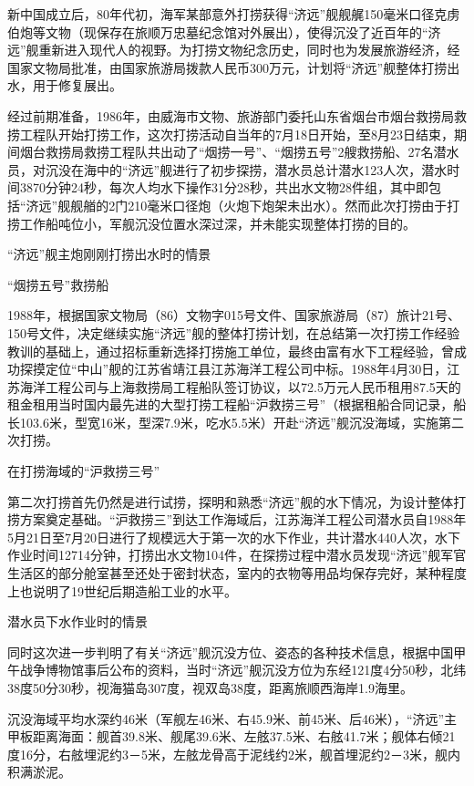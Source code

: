\documentclass[12pt,UTF8]{ctexbook}
\begin{document}
新中国成立后，80年代初，海军某部意外打捞获得“济远”舰舰艉150毫米口径克虏伯炮等文物（现保存在旅顺万忠墓纪念馆对外展出），使得沉没了近百年的“济远”舰重新进入现代人的视野。为打捞文物纪念历史，同时也为发展旅游经济，经国家文物局批准，由国家旅游局拨款人民币300万元，计划将“济远”舰整体打捞出水，用于修复展出。

经过前期准备，1986年，由威海市文物、旅游部门委托山东省烟台市烟台救捞局救捞工程队开始打捞工作，这次打捞活动自当年的7月18日开始，至8月23日结束，期间烟台救捞局救捞工程队共出动了“烟捞一号”、“烟捞五号”2艘救捞船、27名潜水员，对沉没在海中的“济远”舰进行了初步探捞，潜水员总计潜水123人次，潜水时间3870分钟24秒，每次人均水下操作31分28秒，共出水文物28件组，其中即包括“济远”舰舰艏的2门210毫米口径炮（火炮下炮架未出水）。然而此次打捞由于打捞工作船吨位小，军舰沉没位置水深过深，并未能实现整体打捞的目的。

“济远”舰主炮刚刚打捞出水时的情景

“烟捞五号”救捞船

1988年，根据国家文物局（86）文物字015号文件、国家旅游局（87）旅计21号、150号文件，决定继续实施“济远”舰的整体打捞计划，在总结第一次打捞工作经验教训的基础上，通过招标重新选择打捞施工单位，最终由富有水下工程经验，曾成功探摸定位“中山”舰的江苏省靖江县江苏海洋工程公司中标。1988年4月30日，江苏海洋工程公司与上海救捞局工程船队签订协议，以72.5万元人民币租用87.5天的租金租用当时国内最先进的大型打捞工程船“沪救捞三号”（根据租船合同记录，船长103.6米，型宽16米，型深7.9米，吃水5.5米）开赴“济远”舰沉没海域，实施第二次打捞。

在打捞海域的“沪救捞三号”

第二次打捞首先仍然是进行试捞，探明和熟悉“济远”舰的水下情况，为设计整体打捞方案奠定基础。“沪救捞三”到达工作海域后，江苏海洋工程公司潜水员自1988年5月21日至7月20日进行了规模远大于第一次的水下作业，共计潜水440人次，水下作业时间12714分钟，打捞出水文物104件，在探捞过程中潜水员发现“济远”舰军官生活区的部分舱室甚至还处于密封状态，室内的衣物等用品均保存完好，某种程度上也说明了19世纪后期造船工业的水平。

潜水员下水作业时的情景

同时这次进一步判明了有关“济远”舰沉没方位、姿态的各种技术信息，根据中国甲午战争博物馆事后公布的资料，当时“济远”舰沉没方位为东经121度4分50秒，北纬38度50分30秒，视海猫岛307度，视双岛38度，距离旅顺西海岸1.9海里。

沉没海域平均水深约46米（军舰左46米、右45.9米、前45米、后46米），“济远”主甲板距离海面：舰首39.8米、舰尾39.6米、左舷37.5米、右舷41.7米；舰体右倾21度16分，右舷埋泥约3－5米，左舷龙骨高于泥线约2米，舰首埋泥约2－3米，舰内积满淤泥。
\end{document}
